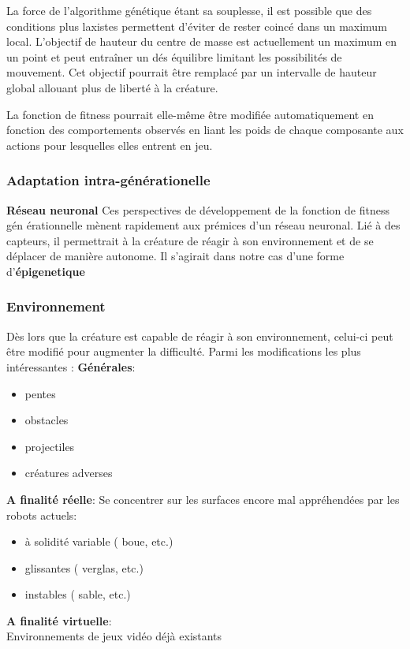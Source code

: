 \documentclass[journal, a4paper]{IEEEtran}
\begin{document}
	La force de l'algorithme génétique étant sa souplesse, il est possible
	que des conditions plus laxistes permettent d'éviter de rester coincé
	dans un maximum local.
	L'objectif de hauteur du centre de masse est
	actuellement un maximum en un point et peut entraîner un dés
	équilibre limitant les possibilités de mouvement.
	Cet objectif pourrait être remplacé par	un intervalle de hauteur
	global allouant plus de liberté à la créature.

	La fonction de fitness pourrait elle-même être modifiée
	automatiquement en fonction des comportements observés en liant
	les poids de chaque composante aux actions pour lesquelles elles
	entrent en jeu.

\subsubsection{Adaptation intra-générationelle}
	\textbf{Réseau neuronal}
	Ces perspectives de développement de la fonction de fitness gén
	érationnelle
	mènent rapidement aux prémices d'un réseau neuronal.
	Lié à des capteurs, il permettrait à la créature de réagir
	à son environnement et de se déplacer de manière autonome.
	Il s'agirait dans notre cas d'une forme d'\textbf{épigenetique}
%
\subsubsection{Environnement}
	Dès lors que la créature est capable de réagir à son environnement,
	celui-ci peut être modifié pour augmenter la difficulté.
	Parmi les modifications les plus intéressantes :
	\textbf{Générales}:
	\begin{itemize}
			\item pentes
			\item obstacles
			\item projectiles
			\item créatures adverses
		\end{itemize}

	\textbf{A finalité réelle}:
	Se concentrer sur les surfaces encore mal appréhendées par les
	robots actuels:
	\begin{itemize}
			\item à solidité variable ( boue, etc.)
			\item glissantes ( verglas, etc.)
			\item instables ( sable, etc.)
		\end{itemize}

	\textbf{A finalité virtuelle}:
	\\Environnements de jeux vidéo déjà existants
\end{document}
